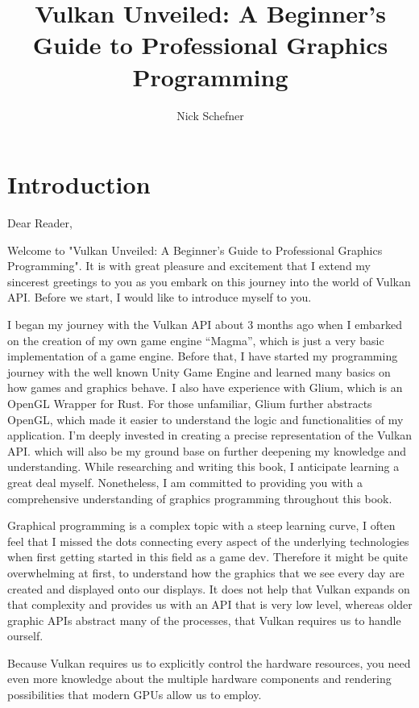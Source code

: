 \documentclass[12pt]{report} \usepackage{preamble}
\title{\textbf{\huge Vulkan Unveiled: A Beginner's Guide to Professional
Graphics Programming}} \author {Nick Schefner}
\begin{document}
 \maketitle

\tableofcontents

\chapter{Introduction}

Dear Reader,

Welcome to "Vulkan Unveiled: A Beginner's Guide to Professional Graphics Programming".
It is with great pleasure and excitement that I extend my sincerest greetings
to you as you embark on this journey into the world of Vulkan API.
Before we start, I would like to introduce myself to you.

I began my journey with the Vulkan API about 3 months ago when I embarked
on the creation of my own game engine “Magma”, which is just a very basic
implementation of a game engine. Before that, I have
started my programming journey with the well known Unity Game Engine
and learned many basics on how games and graphics behave. I also have
experience with Glium, which is an OpenGL Wrapper for Rust. For those
unfamiliar, Glium further abstracts OpenGL, which made it easier to
understand the logic and functionalities of my application.  I’m deeply
invested in creating a precise representation of the Vulkan API.
which will also be my ground base on further deepening my knowledge and
understanding.	While researching and writing this book, I anticipate
learning a great deal myself.  Nonetheless, I am committed to providing
you with a comprehensive understanding of graphics programming throughout
this book.

Graphical programming is a complex topic with a steep learning curve,
I often feel that I missed the dots connecting every aspect of the
underlying technologies when first getting started in this field as a
game dev. Therefore it might be quite overwhelming at first, to understand
how the graphics that we see every day are created and displayed onto
our displays. It does not help that Vulkan expands on that complexity
and provides us with an API that is very low level, whereas older graphic
APIs abstract many of the processes, that Vulkan requires us to handle
ourself.

Because Vulkan requires us to explicitly control the hardware resources,
you need even more knowledge about the multiple hardware components and
rendering possibilities that modern GPUs allow us to employ.
\end{document}
